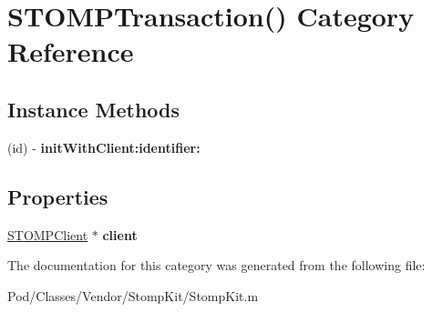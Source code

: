 \hypertarget{category_s_t_o_m_p_transaction_07_08}{}\section{S\+T\+O\+M\+P\+Transaction() Category Reference}
\label{category_s_t_o_m_p_transaction_07_08}
\subsection*{Instance Methods}
\begin{DoxyCompactItemize}
\item 
(id) -\/ {\bfseries init\+With\+Client\+:identifier\+:}\hypertarget{category_s_t_o_m_p_transaction_07_08_a349a6d2451f39bc38c8e2e06a6f37e10}{}\label{category_s_t_o_m_p_transaction_07_08_a349a6d2451f39bc38c8e2e06a6f37e10}

\end{DoxyCompactItemize}
\subsection*{Properties}
\begin{DoxyCompactItemize}
\item 
\hyperlink{interface_s_t_o_m_p_client}{S\+T\+O\+M\+P\+Client} $\ast$ {\bfseries client}\hypertarget{category_s_t_o_m_p_transaction_07_08_ab2516df3062a0a0e2d9df2140e3b41b4}{}\label{category_s_t_o_m_p_transaction_07_08_ab2516df3062a0a0e2d9df2140e3b41b4}

\end{DoxyCompactItemize}


The documentation for this category was generated from the following file\+:\begin{DoxyCompactItemize}
\item 
Pod/\+Classes/\+Vendor/\+Stomp\+Kit/Stomp\+Kit.\+m\end{DoxyCompactItemize}
